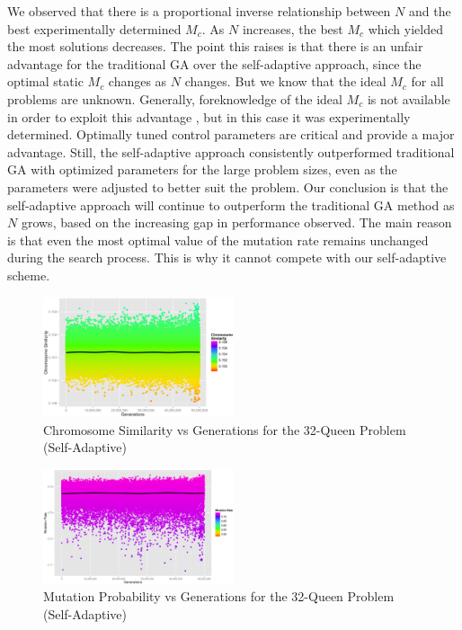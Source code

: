 \documentclass[conference]{IEEEtran}
\begin{document}
We observed that there is a proportional inverse relationship between $N$ and the best experimentally determined $M_{c}$. As $N$ increases, the best $M_{c}$ which yielded the most solutions decreases. The point this raises is that there is an unfair advantage for the traditional GA over the self-adaptive approach, since the optimal static $M_{c}$ changes as $N$ changes. But we know that the ideal $M_{c}$ for all problems are unknown. Generally, foreknowledge of the ideal $M_{c}$ is not available in order to exploit this advantage \cite{cit:14}, but in this case it was experimentally determined. Optimally tuned control parameters are critical and provide a major advantage. Still, the self-adaptive approach consistently outperformed traditional GA with optimized parameters for the large problem sizes, even as the parameters were adjusted to better suit the problem. Our conclusion is that the self-adaptive approach will continue to outperform the traditional GA method as $N$ grows, based on the increasing gap in performance observed. The main reason is that even the most optimal value of the mutation rate remains unchanged during the search process. This is why it cannot compete with our self-adaptive scheme.

\begin{figure}[htp]
\centerline{\includegraphics[width=0.50\textwidth]{figures/similarity_variable_32q_3.png}}
\vspace{-6pt}
\caption{Chromosome Similarity vs Generations for the 32-Queen Problem (Self-Adaptive)} 
\label{fig:sim32q}
\end{figure}

\begin{figure}[htp]
\centerline{\includegraphics[width=0.50\textwidth]{figures/mutation_32q_1.png}}
\vspace{-6pt}
\caption{Mutation Probability vs Generations for the 32-Queen Problem (Self-Adaptive)} 
\label{fig:mutation32q}
\end{figure}
\end{document}
